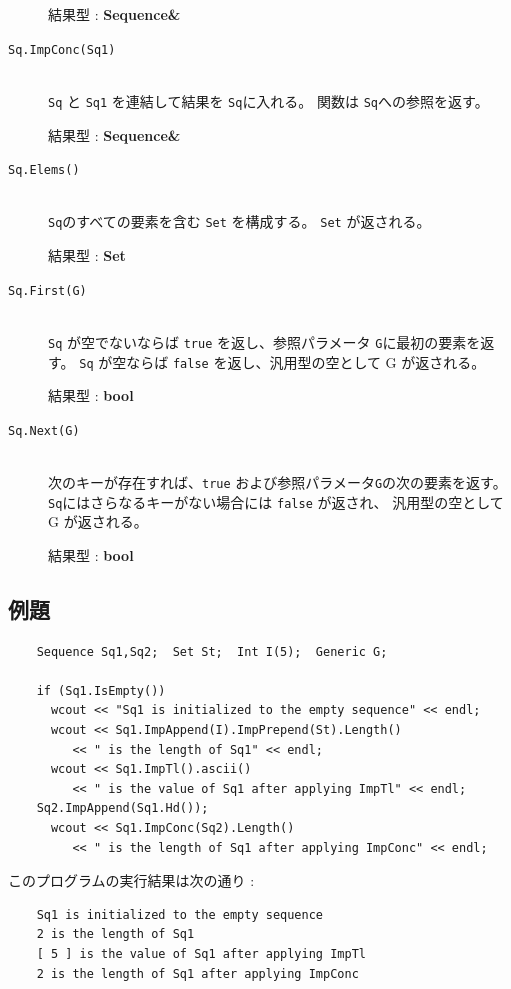 \documentclass[\pformat,12pt]{jarticle}
\begin{document}
\begin{description}
     結果型 : {\bf Sequence\&}

\item[{\tt Sq.ImpConc(Sq1)}] \mbox{}\\     
      {\tt Sq} と {\tt Sq1} を連結して結果を {\tt Sq}に入れる。
     関数は {\tt Sq}への参照を返す。

     結果型 : {\bf Sequence\&}

\item[{\tt Sq.Elems()}] \mbox{}\\     
     {\tt Sq}のすべての要素を含む {\tt Set} を構成する。 {\tt Set} が返される。

     結果型 : {\bf Set}

\item[{\tt Sq.First(G)}] \mbox{}\\     
      {\tt Sq} が空でないならば {\tt true} を返し、参照パラメータ {\tt G}に最初の要素を返す。 
 {\tt Sq} が空ならば {\tt false} を返し、汎用型の空として G が返される。

     結果型 : {\bf bool}
     
\item[{\tt Sq.Next(G)}] \mbox{}\\     
      次のキーが存在すれば、{\tt true} および参照パラメータ{\tt G}の次の要素を返す。 
 {\tt Sq}にはさらなるキーがない場合には {\tt false} が返され、 汎用型の空としてG が返される。

     結果型 : {\bf bool}
\end{description}

\subsection*{例題}

\begin{verbatim}
    Sequence Sq1,Sq2;  Set St;  Int I(5);  Generic G;

    if (Sq1.IsEmpty()) 
      wcout << "Sq1 is initialized to the empty sequence" << endl;
      wcout << Sq1.ImpAppend(I).ImpPrepend(St).Length()
         << " is the length of Sq1" << endl;
      wcout << Sq1.ImpTl().ascii()
         << " is the value of Sq1 after applying ImpTl" << endl;
    Sq2.ImpAppend(Sq1.Hd());
      wcout << Sq1.ImpConc(Sq2).Length()
         << " is the length of Sq1 after applying ImpConc" << endl;
\end{verbatim}

\noindent このプログラムの実行結果は次の通り :

\begin{verbatim}
    Sq1 is initialized to the empty sequence
    2 is the length of Sq1
    [ 5 ] is the value of Sq1 after applying ImpTl
    2 is the length of Sq1 after applying ImpConc
\end{verbatim}
\end{document}
